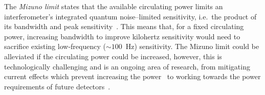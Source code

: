 \label{sec:circulating_power}

The \emph{Mizuno limit} states that the available circulating power limits an interferometer's integrated quantum noise--limited sensitivity, i.e.\ the product of its bandwidth and peak sensitivity~\cite{miaoFundamentalQuantumLimit2017}.
This means that, for a fixed circulating power, increasing bandwidth to improve kilohertz sensitivity would need to sacrifice existing low-frequency ($\sim100$~Hz) sensitivity. %
The Mizuno limit could be alleviated if the circulating power could be increased, however, this is technologically challenging and is an ongoing area of research, from mitigating current effects which prevent increasing the power~\cite{Brooks_2021,PhysRevLett.114.161102} to working towards the power requirements of future detectors~\cite{hardwick_2019}. 
